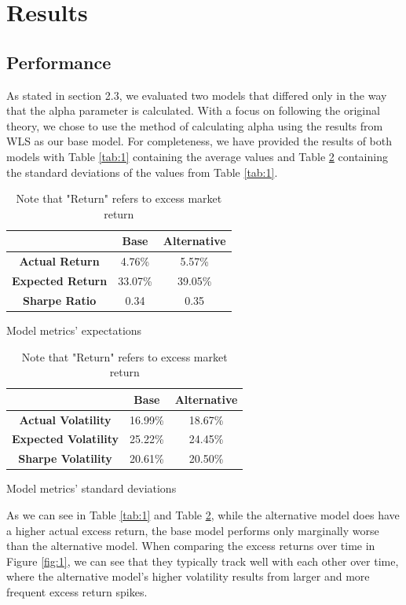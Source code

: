 \documentclass[final]{article}
\begin{document}
\section{Results}

\subsection{Performance}
\hspace{\parindent}As stated in section 2.3, we evaluated two models that differed only in the way that the alpha parameter is calculated. With a focus on following the original theory, we chose to use the method of calculating alpha using the results from WLS as our base model. For completeness, we have provided the results of both models with Table \ref{tab:1} containing the average values and Table \ref{tab:2} containing the standard deviations of the values from Table \ref{tab:1}.

\begin{table}[ht]
\parbox{0.5\linewidth} {
    \centering
    \begin{tabular}{|c||c|c|}
        \hline
         & \textbf{Base} & \textbf{Alternative}\\
         \hline\hline
        \textbf{Actual Return} & 4.76\% & 5.57\% \\
        \hline
        \textbf{Expected Return} & 33.07\% & 39.05\% \\
        \hline
        \textbf{Sharpe Ratio} & 0.34 & 0.35 \\
        \hline
    \end{tabular}
    \caption{Model metrics' expectations}
    \label{tab:1}
    }
    \hfill
\parbox{0.5\linewidth}{
    \centering
    \begin{tabular}{|c||c|c|}
        \hline
         & \textbf{Base} & \textbf{Alternative}\\
         \hline\hline
        \textbf{Actual Volatility} & 16.99\% & 18.67\% \\
        \hline
        \textbf{Expected Volatility} & 25.22\% & 24.45\% \\
        \hline
        \textbf{Sharpe Volatility} & 20.61\% & 20.50\% \\
        \hline
    \end{tabular}
    \caption{Model metrics' standard deviations}
    \label{tab:2}
    }
    \caption*{Note that "Return" refers to excess market return}
\end{table}

As we can see in Table \ref{tab:1} and Table \ref{tab:2}, while the alternative model does have a higher actual excess return, the base model performs only marginally worse than the alternative model. When comparing the excess returns over time in Figure \ref{fig:1}, we can see that they typically track well with each other over time, where the alternative model's higher volatility results from larger and more frequent excess return spikes.
\end{document}
